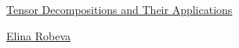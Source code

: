 \documentclass[11pt]{article}
\begin{document}
	\kaishu 
	\setcounter{section}{0}
	\begin{center}
		{\LARGE  \href{https://sites.google.com/view/ubc-math-605d/lectures}{Tensor Decompositions and Their Applications}}
		
		
		{\large \href{https://personal.math.ubc.ca/~erobeva/index.html}{Elina Robeva}}
	\end{center}
\setcounter{page}{1}



\vspace{-1cm}
\end{document}
